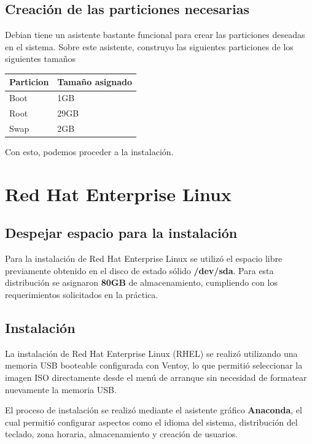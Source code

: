 \documentclass[11pt, letterpaper]{article}
\begin{document}
\subsection{Creación de las particiones necesarias}
\label{sec:org18adff2}

Debian tiene un asistente bastante funcional para crear las particiones deseadas en el sistema. Sobre este asistente, construyo las siguientes particiones de los siguientes tamaños

\begin{center}
\begin{tabular}{ll}
\hline
Particion & Tamaño asignado\\
\hline
Boot & 1GB\\
\hline
Root & 29GB\\
\hline
Swap & 2GB\\
\hline
\end{tabular}
\end{center}

Con esto, podemos proceder a la instalación.
\section{Red Hat Enterprise Linux}
\label{sec:orgb584fad}

\subsection{Despejar espacio para la instalación}
\label{sec:orgredhatespacio}

Para la instalación de Red Hat Enterprise Linux se utilizó el espacio libre previamente obtenido en el disco de estado sólido \textbf{/dev/sda}. Para esta distribución se asignaron \textbf{80GB} de almacenamiento, cumpliendo con los requerimientos solicitados en la práctica.

\subsection{Instalación}
\label{sec:orgredhatinstalacion}

La instalación de Red Hat Enterprise Linux (RHEL) se realizó utilizando una memoria USB booteable configurada con Ventoy, lo que permitió seleccionar la imagen ISO directamente desde el menú de arranque sin necesidad de formatear nuevamente la memoria USB.

El proceso de instalación se realizó mediante el asistente gráfico \textbf{Anaconda}, el cual permitió configurar aspectos como el idioma del sistema, distribución del teclado, zona horaria, almacenamiento y creación de usuarios.
\end{document}
